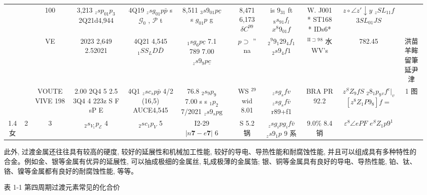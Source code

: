 \documentclass[10pt]{article}
\begin{document}
\begin{center}
{\begin{tabular}{|c|c|c|c|c|c|c|c|c|c|c|c|}
\cline{1-6}
\cline{8-12}
\phantom{X} & \phantom{X} & 100 & 3,213 \({}_{z}s{p}_{01}{p}_{3}\) 2Q21d4,944 & 4Q19 \({}_{z}s{g}_{01}p\bar{p}\) s \({\mathcal{G}}_{0}\) , \(\mathcal{P}\) t & 8,511 \({}_{3}s{9}_{01}p\underline{c}\) s \({g}_{01}p\) g & & 8,471 6,173 \(\delta {C}^{99}\) & is \({9}_{31}\) ft \({}_{8}{s}_{91}{f}_{l}\) \({x}^{8}{9}_{01}f\) & W. J001 * ST168 * IDs6* & \(z \circ \angle z\prime \downarrow y\) \({}_{z}S{L}_{11}f\) \({3S}{L}_{01}{JS}\) & \phantom{X} \\
\cline{1-6}
\cline{8-12}
\phantom{X} & \phantom{X} & VE & 2023 2,649 2.52021 & 4Q21 4,545 \({}_{1}S{S}_{L}D\bar{D}\) & \({}_{1}s{g}_{6}p\underline{c}\) 7.1 789 7.00 \({}_{z}s{9}_{9}p\underline{c}\) & & \(p \supset\) ” na & \({}_{2}{}^{9}{9}_{1}{29}_{4}{f}_{1}\) \({}_{2}s{9}_{4}{f1}\) & \({}^{\mathrm{{II}} \sqsupset }{}^{9}{}^{8}\) 水 WV’s & 782.45 & 洪苗羊眸留筆延尹津 \\
\cline{1-6}
\cline{8-12}
\phantom{X} & \phantom{X} & VOUTE VIVE 198 & 2.00 2Q4 5 2.5 3Q4 4 223z S F sP E & 4Q1 \({}_{z}s{c}_{s}p\bar{p}\) 4/2 (16,5) AUCE4,545 & 76.8 \({}_{2}{s}_{9}{p}_{9}\) 7.00 s s \({}_{1}{p}_{2}\) 7/2021 \({}_{z}s{9}_{s}p\mathrm{g}\) & & WS \({}^{29}\) wid 8.01 & \({}_{z}s{g}_{s}{fv}\) \({}_{z}s{g}_{s}f\bar{v}\) r89+f1 & BRA PR 92.2 & \({z}^{S}{Z}_{9}{fS}\) \({}_{2}{8}_{1}{p}_{9}{}_{v}{f}^{c}{|}_{v}\) \(\left\lbrack {{z}^{8}{Z}_{1}P{9}_{8}}\right\rbrack f =\) & 1 图 \\
\cline{1-6}
\cline{8-12}
1.4 女 & 2 & 3 & \({}_{2}{s}_{{V}_{1}}{p}_{\mathcal{E}}\) 4 & \({}_{2}s{c}_{1}{p}_{V}\) 5 & I2-29 \(\left| {n\mathbf{7} - e\mathbf{7}}\right|\) 6 & & S 5.2 锅 & \({}_{z}s{g}_{i}p{g}_{i}f\bar{v}\) \({}_{z}s{9}_{1}p\) 9 系 & 9.0\% 8.4 销 & \({\varepsilon }^{8}\angle {ePF}\) \({e}^{S}{Z}_{1}p{9}^{1}\) & \phantom{X} \\
\hline
\end{tabular}
}
\end{center}

此外, 过渡金属还往往具有较高的硬度, 较好的延展性和机械加工性能, 较好的导电、导热性能和耐腐蚀性能, 并且可以组成具有多种特性的合金。例如金、银等金属有优异的延展性, 可以抽成极细的金属丝, 轧成极薄的金属箔; 银、铜等金属具有良好的导电、导热性能, 铂、钛、铬、镍等金属都有良好的耐腐蚀性能, 等等。

表 1-1 第四周期过渡元素常见的化合价
\end{document}
